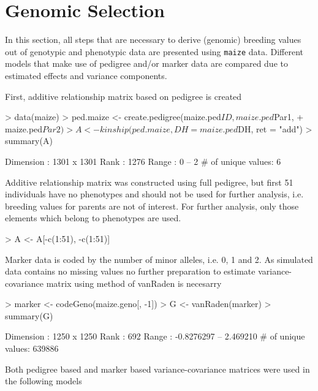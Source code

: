 \documentclass[a4paper,11pt]{article}
\begin{document}
\section{Genomic Selection} \label{sec:genomicSelection}

In this section, all steps that are necessary to derive (genomic) breeding values out of genotypic and phenotypic data are presented using \texttt{maize} data. Different models that make use of pedigree and/or marker data
are compared due to estimated effects and variance components.

First, additive relationship matrix based on pedigree is created
\begin{Schunk}
\begin{Sinput}
> data(maize)
> ped.maize <- create.pedigree(maize.ped$ID, maize.ped$Par1, 
+     maize.ped$Par2)
> A <- kinship(ped.maize, DH = maize.ped$DH, ret = "add")
> summary(A)
\end{Sinput}
\begin{Soutput}
Dimension         : 1301 x 1301 
Rank              : 1276 
Range             : 0 -- 2 
# of unique values: 6 
\end{Soutput}
\end{Schunk}
Additive relationship matrix was constructed using full pedigree, but first 51 individuals have no phenotypes and should not be used for further analysis, i.e. breeding values for parents are not of interest. For further analysis, only those elements which belong to phenotypes are used.
\begin{Schunk}
\begin{Sinput}
> A <- A[-c(1:51), -c(1:51)]
\end{Sinput}
\end{Schunk}
Marker data is coded by the number of minor alleles, i.e. 0, 1 and 2. As simulated data contains no missing values no further preparation to estimate variance-covariance matrix using method of vanRaden is necesarry
\begin{Schunk}
\begin{Sinput}
> marker <- codeGeno(maize.geno[, -1])
> G <- vanRaden(marker)
> summary(G)
\end{Sinput}
\begin{Soutput}
Dimension         : 1250 x 1250 
Rank              : 692 
Range             : -0.8276297 -- 2.469210 
# of unique values: 639886 
\end{Soutput}
\end{Schunk}
Both pedigree based and marker based variance-covariance matrices were used in the following models
\end{document}
